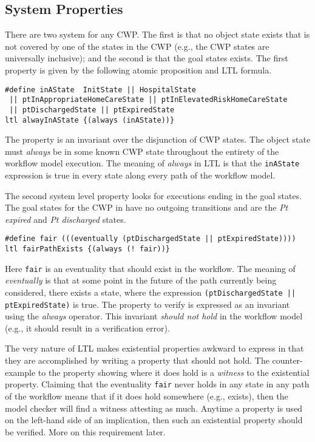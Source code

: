 \subsection{System Properties}
There are two system for any CWP. The first is that no object state exists that is not covered by one of the states in the CWP (e.g., the CWP states are universally inclusive); and the second is that the goal states exists. The first property is given by the following atomic proposition and LTL formula.
%
{\small
\begin{lstlisting}[style=myPromela]
#define inAState  InitState || HospitalState 
 || ptInAppropriateHomeCareState || ptInElevatedRiskHomeCareState
 || ptDischargedState || ptExpiredState
ltl alwayInAState {(always (inAState))}
\end{lstlisting}
}
%
\noindent The property is an invariant over the disjunction of CWP states. The object state must \emph{always} be in some known CWP state throughout the entirety of the workflow model execution. The meaning of \emph{always} in LTL is that the \texttt{inAState} expression is true in every state along every path of the workflow model.

The second system level property looks for executions ending in the goal states. The goal states for the CWP in  have no outgoing transitions and are the \emph{Pt expired} and \emph{Pt discharged} states.
%
{\small
\begin{lstlisting}[style=myPromela]
#define fair (((eventually (ptDischargedState || ptExpiredState))))
ltl fairPathExists {(always (! fair))}
\end{lstlisting}
}
%
\noindent Here \texttt{fair} is an eventuality that should exist in the workflow. The meaning of \emph{eventually} is that at some point in the future of the path currently being considered, there exists a state, where the expression \texttt{(ptDischargedState || ptExpiredState)} is true. The property to verify is expressed as an invariant using the \emph{always} operator. This invariant \emph{should not hold} in the workflow model (e.g., it should result in a verification error). 

The very nature of LTL makes existential properties awkward to express in that they are accomplished by writing a property that should not hold. The counter-example to the property showing where it does hold is a \emph{witness} to the existential property. Claiming that the eventuality \texttt{fair} never holds in any state in any path of the workflow means that if it does hold somewhere (e.g., exists), then the model checker will find a witness attesting as much. Anytime a property is used on the left-hand side of an implication, then such an existential property should be verified. More on this requirement later.

